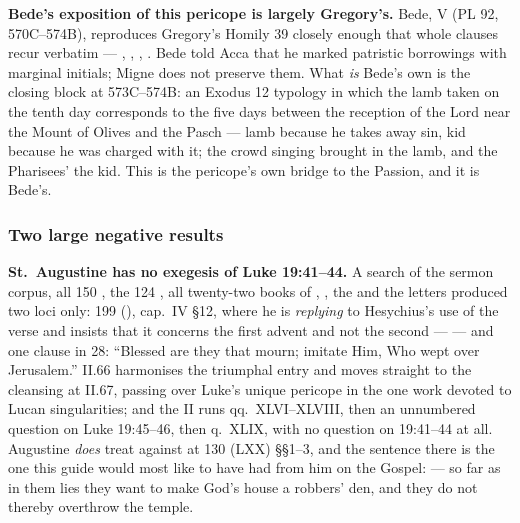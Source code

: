 \textbf{Bede's exposition of this pericope is largely Gregory's.} Bede,
 V (PL 92, 570C--574B), reproduces
Gregory's Homily 39 closely enough that whole clauses recur verbatim ---
, ,
, . Bede told Acca that he marked patristic borrowings with marginal
initials; Migne does not preserve them. What \textit{is} Bede's own is the
closing block at 573C--574B: an Exodus 12 typology in which the lamb taken on
the tenth day corresponds to the five days between the reception of the Lord
near the Mount of Olives and the Pasch --- lamb because he takes away sin, kid
because he was charged with it; the crowd singing 
brought in the lamb, and the Pharisees'  the kid. This is the pericope's own bridge to the Passion, and it is
Bede's.

\subsubsection*{Two large negative results}

\textbf{St.\ Augustine has no exegesis of Luke 19:41--44.} A search of the
sermon corpus, all 150 , the 124 ,
all twenty-two books of , , the  and the letters produced
two loci only:  199 (), cap.~IV §12,
where he is \textit{replying} to Hesychius's use of the verse and insists that
it concerns the first advent and not the second ---  --- and one clause in  28: ``Blessed are they that mourn; imitate Him, Who wept
over Jerusalem.''  II.66 harmonises the
triumphal entry and moves straight to the cleansing at II.67, passing over
Luke's unique pericope in the one work devoted to Lucan singularities; and the
 II runs qq.~XLVI--XLVIII, then an unnumbered
question on Luke 19:45--46, then q.~XLIX, with no question on 19:41--44 at all.
Augustine \textit{does} treat  against  at  130 (LXX) §§1--3, and the sentence there is
the one this guide would most like to have had from him on the Gospel:
 --- so far as in them lies they want to make God's
house a robbers' den, and they do not thereby overthrow the temple.

